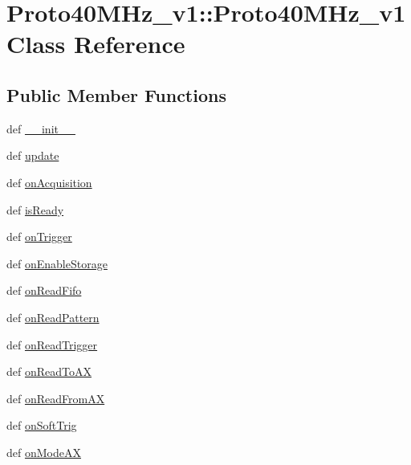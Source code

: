 \hypertarget{classProto40MHz__v1_1_1Proto40MHz__v1}{
\section{Proto40MHz\_\-v1::Proto40MHz\_\-v1 Class Reference}
\label{classProto40MHz__v1_1_1Proto40MHz__v1}
}
\subsection*{Public Member Functions}
\begin{DoxyCompactItemize}
\item 
def \hyperlink{classProto40MHz__v1_1_1Proto40MHz__v1_a14f512fbb4278e3d52edb203544153c2}{\_\-\_\-init\_\-\_\-}
\item 
def \hyperlink{classProto40MHz__v1_1_1Proto40MHz__v1_aebbe60409da00f6507197915228ba2e8}{update}
\item 
def \hyperlink{classProto40MHz__v1_1_1Proto40MHz__v1_a0ca413d70eb9ded8b86ca04e71eaccc4}{onAcquisition}
\item 
def \hyperlink{classProto40MHz__v1_1_1Proto40MHz__v1_ad828595957c65e5771f01691411b5452}{isReady}
\item 
def \hyperlink{classProto40MHz__v1_1_1Proto40MHz__v1_a983e857859f00e9fed6dc1b1613e8901}{onTrigger}
\item 
def \hyperlink{classProto40MHz__v1_1_1Proto40MHz__v1_ab87e6a24d0dffbaa784f6fe93f3f48ef}{onEnableStorage}
\item 
def \hyperlink{classProto40MHz__v1_1_1Proto40MHz__v1_a2fb8cc3ec38763ada1a27fa4e4137208}{onReadFifo}
\item 
def \hyperlink{classProto40MHz__v1_1_1Proto40MHz__v1_afd43e744880663f93269829bbf854ad2}{onReadPattern}
\item 
def \hyperlink{classProto40MHz__v1_1_1Proto40MHz__v1_aa5465792296713450c770b2d05da789c}{onReadTrigger}
\item 
def \hyperlink{classProto40MHz__v1_1_1Proto40MHz__v1_a07a2d5cfd891aa90a4644fdd57733fda}{onReadToAX}
\item 
def \hyperlink{classProto40MHz__v1_1_1Proto40MHz__v1_aa3f5a0cfb0cd36010d655aaacacf47d2}{onReadFromAX}
\item 
def \hyperlink{classProto40MHz__v1_1_1Proto40MHz__v1_a41e05abb2dd6785a43b62104da43ed40}{onSoftTrig}
\item 
def \hyperlink{classProto40MHz__v1_1_1Proto40MHz__v1_acfd6d650ac779f0837c462e9f7064d2c}{onModeAX}
\item 

\end{DoxyCompactItemize}
